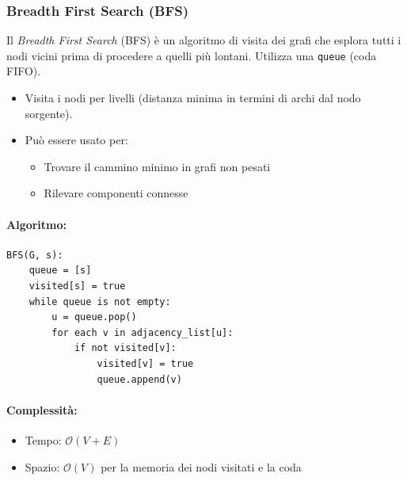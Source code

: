 \subsubsection*{Breadth First Search (BFS)}

Il \textit{Breadth First Search} (BFS) è un algoritmo di visita dei grafi che esplora tutti i nodi vicini prima di procedere a quelli più lontani. Utilizza una \texttt{queue} (coda FIFO).

\begin{itemize}
    \item Visita i nodi per livelli (distanza minima in termini di archi dal nodo sorgente).
    \item Può essere usato per:
    \begin{itemize}
        \item Trovare il cammino minimo in grafi non pesati
        \item Rilevare componenti connesse
    \end{itemize}
\end{itemize}

\paragraph{Algoritmo:}

\begin{verbatim}
BFS(G, s):
    queue = [s]
    visited[s] = true
    while queue is not empty:
        u = queue.pop()
        for each v in adjacency_list[u]:
            if not visited[v]:
                visited[v] = true
                queue.append(v)
\end{verbatim}

\paragraph{Complessità:}
\begin{itemize}
    \item Tempo: $\mathcal{O}(V + E)$
    \item Spazio: $\mathcal{O}(V)$ per la memoria dei nodi visitati e la coda
\end{itemize}


